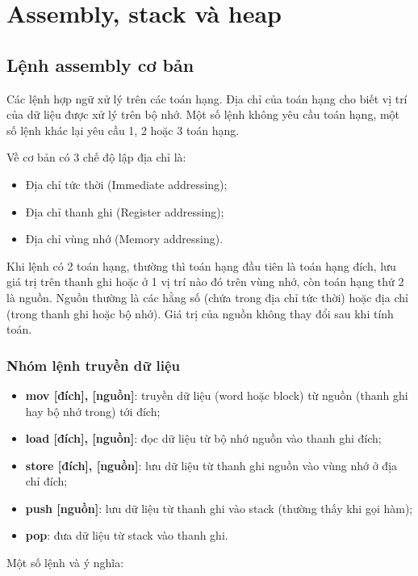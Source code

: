 \chapter{Assembly, stack và heap}

\section{Lệnh assembly cơ bản}

Các lệnh hợp ngữ xử lý trên các toán hạng. Địa chỉ của toán hạng cho biết vị trí của dữ liệu được xử lý trên bộ nhớ. Một số lệnh không yêu cầu toán hạng, một số lệnh khác lại yêu cầu 1, 2 hoặc 3 toán hạng.

Về cơ bản có 3 chế độ lập địa chỉ là:
\begin{itemize}
    \item Địa chỉ tức thời (Immediate addressing);
    \item Địa chỉ thanh ghi (Register addressing);
    \item Địa chỉ vùng nhớ (Memory addressing).
\end{itemize}

Khi lệnh có 2 toán hạng, thường thì toán hạng đầu tiên là toán hạng đích, lưu giá trị trên thanh ghi hoặc ở 1 vị trí nào đó trên vùng nhớ, còn toán hạng thứ 2 là nguồn. Nguồn thường là các hằng số (chứa trong địa chỉ tức thời) hoặc địa chỉ (trong thanh ghi hoặc bộ nhớ). Giá trị của nguồn không thay đổi sau khi tính toán.

\subsection*{Nhóm lệnh truyền dữ liệu}

\begin{itemize}
    \item \textbf{mov [đích], [nguồn]}: truyền dữ liệu (word hoặc block) từ nguồn (thanh ghi hay bộ nhớ trong) tới đích;
    \item \textbf{load [đích], [nguồn]}: đọc dữ liệu từ bộ nhớ nguồn vào thanh ghi đích;
    \item \textbf{store [đích], [nguồn]}: lưu dữ liệu từ thanh ghi nguồn vào vùng nhớ ở địa chỉ đích;
    \item \textbf{push [nguồn]}: lưu dữ liệu từ thanh ghi vào stack (thường thấy khi gọi hàm);
    \item \textbf{pop}: đưa dữ liệu từ stack vào thanh ghi.
\end{itemize}

Một số lệnh và ý nghĩa:

